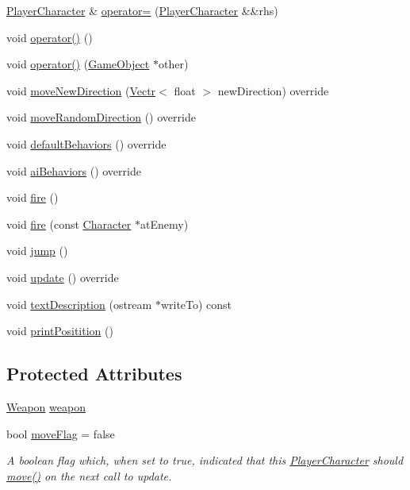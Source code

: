 \begin{DoxyCompactItemize}
\hyperlink{class_player_character}{Player\-Character} \& \hyperlink{class_player_character_af33d69dba65288508b4291ae6aaa1aa3}{operator=} (\hyperlink{class_player_character}{Player\-Character} \&\&rhs)
\item 
void \hyperlink{class_player_character_a067c5b11f7deafd448726ec4ac294b03}{operator()} ()
\item 
void \hyperlink{class_player_character_a1cf7079c60a26c188cf4ed7043a2c9b3}{operator()} (\hyperlink{class_game_object}{Game\-Object} $\ast$other)
\item 
void \hyperlink{class_player_character_a6e9ba6daca1de1e325850f78f3c3bbc9}{move\-New\-Direction} (\hyperlink{struct_vectr}{Vectr}$<$ float $>$ new\-Direction) override
\item 
void \hyperlink{class_player_character_a0c82549ee968726256b518e89b78c605}{move\-Random\-Direction} () override
\item 
void \hyperlink{class_player_character_ac96dd84cef7668557321edc5b251c97c}{default\-Behaviors} () override
\item 
void \hyperlink{class_player_character_af7a8c30b3f40a698c28b095a299657ab}{ai\-Behaviors} () override
\item 
void \hyperlink{class_player_character_a646ce764c65c544fe4b76912b3fd15e5}{fire} ()
\item 
void \hyperlink{class_player_character_acb7767ff11d007399561aeb3445c38b8}{fire} (const \hyperlink{class_character}{Character} $\ast$at\-Enemy)
\item 
void \hyperlink{class_player_character_ab67b7f795e75b73027620483bea2871b}{jump} ()
\item 
void \hyperlink{class_player_character_a2ac275d3de97c5ecc260e93e0585168a}{update} () override
\item 
void \hyperlink{class_player_character_aac83579c2f552973e71008c1b1e01b1d}{text\-Description} (ostream $\ast$write\-To) const 
\item 
void \hyperlink{class_player_character_a0f0464366a0ab7b51d0000f14ad50485}{print\-Positition} ()
\end{DoxyCompactItemize}
\subsection*{Protected Attributes}
\begin{DoxyCompactItemize}
\item 
\hyperlink{class_weapon}{Weapon} \hyperlink{class_player_character_aebf48777d82418e8aa2a01747a117621}{weapon}
\item 
bool \hyperlink{class_player_character_a278a86804d9b5e8eddc66550f9fa82b6}{move\-Flag} = false
\begin{DoxyCompactList}\small\item\em A boolean flag which, when set to true, indicated that this \hyperlink{class_player_character}{Player\-Character} should \hyperlink{class_game_object_aebf4e54c90de73d56186beaebead1ccc}{move()} on the next call to update. \end{DoxyCompactList}\end{DoxyCompactItemize}
